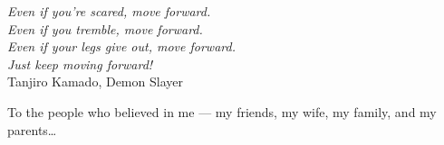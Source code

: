 \cleardoublepage
\thispagestyle{empty}


\vspace*{3cm}

\begin{raggedleft}
    \textit{Even if you’re scared, move forward. \\
    Even if you tremble, move forward. \\
    Even if your legs give out, move forward. \\
    Just keep moving forward!\\}
    \vspace{1em}
    Tanjiro Kamado, Demon Slayer \\
\end{raggedleft}

\vspace{4cm}

\begin{center}
    To the people who believed in me --- my friends, my wife, my family, and my parents\dots
\end{center}


